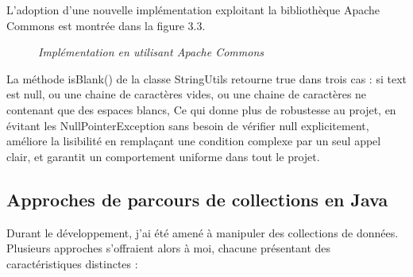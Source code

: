 \documentclass[12pt,a4paper]{report}
\begin{document}
	L'adoption d'une nouvelle implémentation exploitant la bibliothèque Apache Commons est montrée dans la figure 3.3.
	
	\begin{figure}[H]
		\centering
		\caption{\textit{Implémentation en utilisant Apache Commons}}
		\label{fig:after-string-utils}
	\end{figure}
	
	La méthode isBlank() de la classe StringUtils retourne true dans trois cas : si text est null, ou une chaine de caractères vides, ou une chaine de caractères ne contenant que des espaces blancs, Ce qui donne plus de robustesse au projet, en évitant les NullPointerException sans besoin de vérifier null explicitement, améliore la lisibilité en remplaçant une condition complexe par un seul appel clair, et garantit un comportement uniforme dans tout le projet.
	
	\subsection{Approches de parcours de collections en Java}
	
	Durant le développement, j'ai été amené à manipuler des collections de données. Plusieurs approches s'offraient alors à moi, chacune présentant des caractéristiques distinctes :
	
\end{document}
